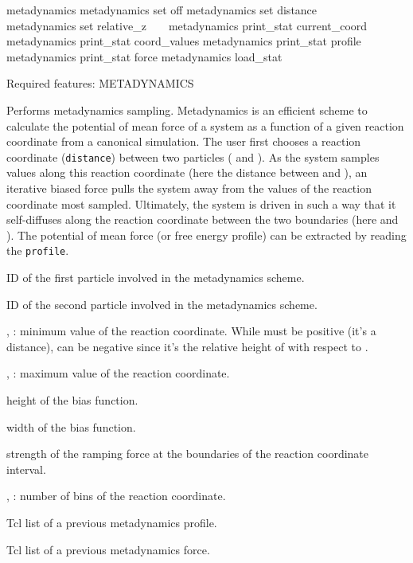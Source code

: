 \begin{essyntax}
   metadynamics 
   metadynamics set off
   metadynamics set distance   \
     \
    
  \variant{4} metadynamics set relative_z \var{pid_1} \var{pid_2} \
     \
    
  \variant{5} metadynamics print_stat current_coord
  \variant{6} metadynamics print_stat coord_values
  \variant{7} metadynamics print_stat profile
  \variant{8} metadynamics print_stat force
  \variant{9} metadynamics load_stat  \

  Required features: METADYNAMICS
\end{essyntax}
Performs metadynamics sampling. Metadynamics is an efficient scheme to
calculate the potential of mean force of a system as a function of a
given reaction coordinate from a canonical simulation. The user first
chooses a reaction coordinate (\eg \texttt{distance}) between two
particles ( and ). As the system samples values
along this reaction coordinate (here the distance between \var{pid_1}
and \var{pid_2}), an iterative biased force pulls the system away from
the values of the reaction coordinate most sampled. Ultimately, the
system is driven in such a way that it self-diffuses along the
reaction coordinate between the two boundaries (here
\var{d_\mathrm{min}} and \var{d_\mathrm{max}}). The potential of mean
force (or free energy profile) can be extracted by reading the
\texttt{profile}. 

\begin{arguments}
\item[\var{pid_1}] ID of the first particle involved in the
  metadynamics scheme.
\item[\var{pid_2}] ID of the second particle involved in the
  metadynamics scheme.
\item[\var{d_\mathrm{min}}, ]: minimum value of
  the reaction coordinate. While \var{d_\mathrm{min}} must be positive
  (it's a distance), \var{z_\mathrm{min}} can be negative since it's
  the relative height of \var{pid_1} with respect to .
\item[\var{d_\mathrm{max}}, \var{z_\mathrm{max}}]: maximum value of
  the reaction coordinate. 
\item[\var{b_\mathrm{height}}] height of the bias function.
\item[\var{b_\mathrm{width}}] width of the bias function.
\item[\var{f_\mathrm{bound}}] strength of the ramping force at the
  boundaries of the reaction coordinate interval.
\item[\var{d_\mathrm{bins}}, \var{z_\mathrm{bins}}]: number of bins of
  the reaction coordinate.
\item[\var{profile\_list}] Tcl list of a previous metadynamics
  profile.
\item[\var{force\_list}] Tcl list of a previous metadynamics force.
\end{arguments}

